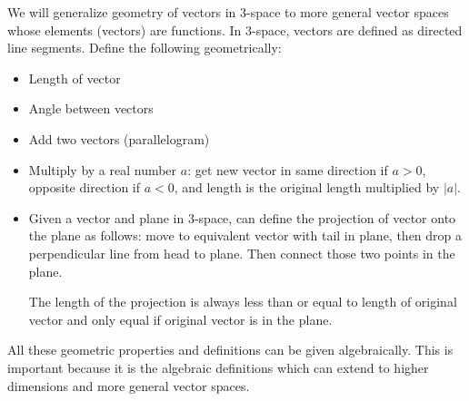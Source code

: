 \documentclass[]{article}
\begin{document}
We will generalize geometry of vectors in 3-space to more general vector spaces whose elements (vectors) are functions. 
In 3-space, vectors are defined as directed line segments. %
Define the following geometrically:
\begin{itemize}
	\item Length of vector
	\item Angle between vectors
	\item Add two vectors (parallelogram)
	\item Multiply by a real number $a$: get new vector in same direction if $a > 0$, opposite direction if $a<0$, and length is the original length multiplied by $|a|$.
	\item Given a vector and plane in 3-space, can define the projection of vector onto the plane as follows: move to equivalent vector with tail in plane, then drop a perpendicular line from head to plane. Then connect those two points in the plane.
	\begin{note}
		The length of the projection is always less than or equal to length of original vector and only equal if original vector is in the plane.
	\end{note}
\end{itemize}
All these geometric properties and definitions can be given algebraically. This is important because it is the algebraic definitions which can extend to higher dimensions and more general vector spaces.
\end{document}
